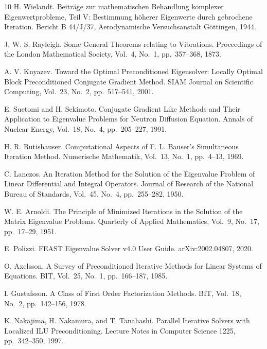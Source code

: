 \documentclass[a4paper]{article}
\begin{document}
\begin{thebibliography}{10}
H. Wielandt.
\newblock Beitr\"age zur mathematischen Behandlung komplexer
	Eigenwertprobleme, Teil V: Bestimmung h\"oherer Eigenwerte durch
	gebrochene Iteration.
\newblock Bericht B 44/J/37, Aerodynamische Versuchsanstalt G\"ottingen, 1944.

J. W. S. Rayleigh.
\newblock Some General Theorems relating to Vibrations.
\newblock Proceedings of the London Mathematical Society, Vol.~4, No.~1,
	pp.\ 357--368, 1873.

A. V. Knyazev.
\newblock Toward the Optimal Preconditioned Eigensolver: Locally Optimal
	Block Preconditioned Conjugate Gradient Method.
\newblock SIAM Journal on Scientific Computing, Vol.~23, No.~2, pp.\ 517--541, 2001.

E. Suetomi and H. Sekimoto.
\newblock Conjugate Gradient Like Methods and Their Application to
	Eigenvalue Problems for Neutron Diffusion Equation.
\newblock Annals of Nuclear Energy, Vol.~18, No.~4, pp.\ 205--227, 1991.

H. R. Rutishauser.
\newblock Computational Aspects of F. L. Bauser's Simultaneous Iteration
	Method.
\newblock Numerische Mathematik, Vol.~13, No.~1, pp.\ 4--13, 1969.

C. Lanczos.
\newblock An Iteration Method for the Solution of the Eigenvalue Problem
	of Linear Differential and Integral Operators.
\newblock Journal of Research of the National Bureau of Standards, Vol.~45, No.~4, pp.\ 255--282, 1950.

W. E. Arnoldi.
\newblock The Principle of Minimized Iterations in the Solution of the Matrix Eigenvalue Problems.
\newblock Quarterly of Applied Mathematics, Vol.~9, No.~17, pp.\ 17--29, 1951.

E. Polizzi.
\newblock FEAST Eigenvalue Solver v4.0 User Guide.
\newblock arXiv:2002.04807, 2020.
  
O. Axelsson.
\newblock A Survey of Preconditioned Iterative Methods for Linear
	Systems of Equations.
\newblock BIT, Vol.~25, No.~1, pp.\ 166--187, 1985.

I. Gustafsson.
\newblock A Class of First Order Factorization Methods.
\newblock BIT, Vol.~18, No.~2, pp.\ 142--156, 1978.

K. Nakajima, H. Nakamura, and T. Tanahashi.
\newblock Parallel Iterative Solvers with Localized ILU Preconditioning.
\newblock Lecture Notes in Computer Science 1225, pp.\ 342--350, 1997.


\end{thebibliography}
\end{document}
